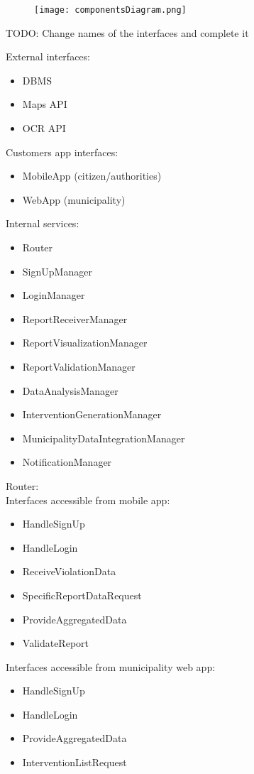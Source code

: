 \begin{figure}[H]
	\texttt{[image: componentsDiagram.png]}
\end{figure}
TODO: Change names of the interfaces and complete it

External interfaces:
\begin{itemize}
	\item DBMS
	\item Maps API
	\item OCR API
\end{itemize}

Customers app interfaces:
\begin{itemize}
	\item MobileApp (citizen/authorities)
	\item WebApp (municipality)
\end{itemize}

Internal services:
\begin{itemize}
	\item Router
	\item SignUpManager
	\item LoginManager
	\item ReportReceiverManager
	\item ReportVisualizationManager
	\item ReportValidationManager
	\item DataAnalysisManager
	\item InterventionGenerationManager
	\item MunicipalityDataIntegrationManager
	\item NotificationManager
\end{itemize}

\bigskip
Router:\\
Interfaces accessible from mobile app:
\begin{itemize}
	\item HandleSignUp
	\item HandleLogin
	\item ReceiveViolationData
	\item SpecificReportDataRequest
	\item ProvideAggregatedData
	\item ValidateReport
\end{itemize}
Interfaces accessible from municipality web app:
\begin{itemize}
	\item HandleSignUp
	\item HandleLogin
	\item ProvideAggregatedData
	\item InterventionListRequest 
\end{itemize}

